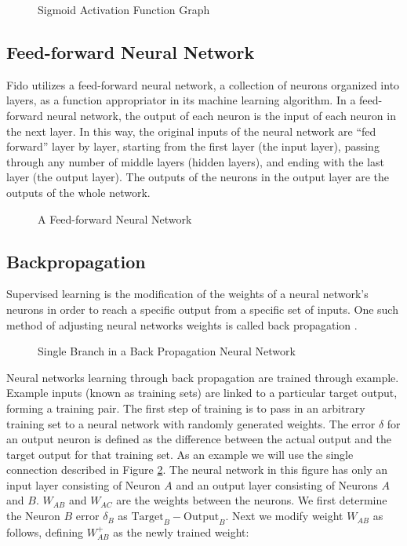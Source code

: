 \begin{figure}[ht]
	\centering
	
	\caption{Sigmoid Activation Function Graph}
\end{figure}

\subsection{Feed-forward Neural Network}

Fido utilizes a feed-forward neural network, a collection of neurons organized into layers, as a function appropriator in its machine learning algorithm. In a feed-forward neural network, the output of each neuron is the input of each neuron in the next layer.
In this way, the original inputs of the neural network are ``fed forward'' layer by layer, starting from the first layer (the input layer), passing through any number of middle layers (hidden layers), and ending with the last layer (the output layer).
The outputs of the neurons in the output layer are the outputs of the whole network.

\begin{figure}[ht]
	\centering
	
	\caption{A Feed-forward Neural Network}
	\label{fig:feedforward}
\end{figure}

\subsection{Backpropagation}

Supervised learning is the modification of the weights of a neural network's neurons in order to reach a specific output from a specific set of inputs.
One such method of adjusting neural networks weights is called back propagation \cite{werbos}.

\begin{figure}[ht]
	\centering
	
	\caption{Single Branch in a Back Propagation Neural Network}
	\label{fig:backprop}
\end{figure}

Neural networks learning through back propagation are trained through example.
Example inputs (known as training sets) are linked to a particular target output, forming a training pair.
The first step of training is to pass in an arbitrary training set to a neural network with randomly generated weights.
The error $\delta$ for an output neuron is defined as the difference between the actual output and the target output for that training set.
As an example we will use the single connection described in Figure \ref{fig:backprop}.
The neural network in this figure has only an input layer consisting of Neuron $A$ and an output layer consisting of Neurons $A$ and $B$.
$W_{AB}$  and $W_{AC}$ are the weights between the neurons.
We first determine the Neuron $B$ error $\delta_B$ as $\text{Target}_B - \text{Output}_B$.
 Next we modify weight $W_{AB}$ as follows, defining $W_{AB}^{+}$ as the newly trained weight:

